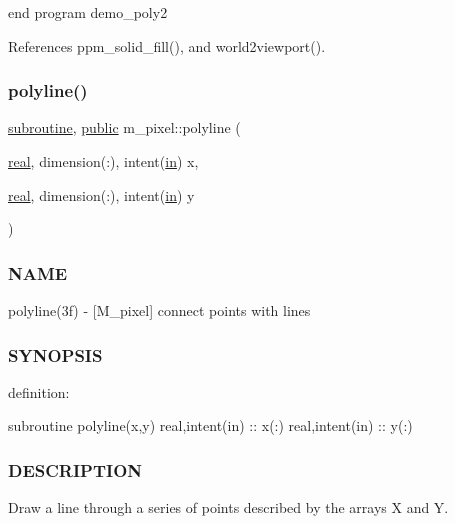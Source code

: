 end program demo\+\_\+poly2 

References ppm\+\_\+solid\+\_\+fill(), and world2viewport().

\mbox{\label{namespacem__pixel_a067e896f50047694a52c30cffa6f502f}} 
\subsubsection{\texorpdfstring{polyline()}{polyline()}}
{\footnotesize\ttfamily \hyperlink{M__stopwatch_83_8txt_acfbcff50169d691ff02d4a123ed70482}{subroutine}, \hyperlink{M__stopwatch_83_8txt_a2f74811300c361e53b430611a7d1769f}{public} m\+\_\+pixel\+::polyline (\begin{DoxyParamCaption}\item[{\hyperlink{read__watch_83_8txt_abdb62bde002f38ef75f810d3a905a823}{real}, dimension(\+:), intent(\hyperlink{M__journal_83_8txt_afce72651d1eed785a2132bee863b2f38}{in})}]{x,  }\item[{\hyperlink{read__watch_83_8txt_abdb62bde002f38ef75f810d3a905a823}{real}, dimension(\+:), intent(\hyperlink{M__journal_83_8txt_afce72651d1eed785a2132bee863b2f38}{in})}]{y }\end{DoxyParamCaption})}



\subsubsection*{N\+A\+ME}

polyline(3f) -\/ \mbox{[}M\+\_\+pixel\mbox{]} connect points with lines 

\subsubsection*{S\+Y\+N\+O\+P\+S\+IS}

definition\+:

subroutine polyline(x,y) real,intent(in) \+:\+: x(\+:) real,intent(in) \+:\+: y(\+:)

\subsubsection*{D\+E\+S\+C\+R\+I\+P\+T\+I\+ON}

Draw a line through a series of points described by the arrays X and Y.

